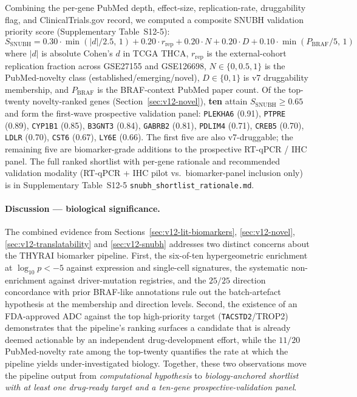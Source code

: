 Combining the per-gene PubMed depth, effect-size, replication-rate, druggability flag,
and ClinicalTrials.gov record, we computed a composite SNUBH validation priority score
(Supplementary Table~S12-5):
\[
S_\text{SNUBH} = 0.30 \cdot \min(|d|/2.5,\, 1) + 0.20 \cdot r_\text{rep}
                 + 0.20 \cdot N + 0.20 \cdot D
                 + 0.10 \cdot \min(P_\text{BRAF}/5,\, 1)
\]
where $|d|$ is absolute Cohen's $d$ in TCGA THCA, $r_\text{rep}$ is the external-cohort
replication fraction across GSE27155 and GSE126698, $N \in \{0, 0.5, 1\}$ is the
PubMed-novelty class (established/emerging/novel), $D \in \{0, 1\}$ is v7 druggability
membership, and $P_\text{BRAF}$ is the BRAF-context PubMed paper count. Of the top-twenty
novelty-ranked genes (Section~\ref{sec:v12-novel}), \textbf{ten} attain
$S_\text{SNUBH} \geq 0.65$ and form the first-wave prospective validation panel:
\texttt{PLEKHA6} (0.91), \texttt{PTPRE} (0.89), \texttt{CYP1B1} (0.85), \texttt{B3GNT3}
(0.84), \texttt{GABRB2} (0.81), \texttt{PDLIM4} (0.71), \texttt{CREB5} (0.70),
\texttt{LDLR} (0.70), \texttt{CST6} (0.67), \texttt{LY6E} (0.66). The first five are also
v7-druggable; the remaining five are biomarker-grade additions to the prospective
RT-qPCR / IHC panel. The full ranked shortlist with per-gene rationale and recommended
validation modality (RT-qPCR + IHC pilot vs.\ biomarker-panel inclusion only) is in
Supplementary Table~S12-5 \texttt{snubh\_shortlist\_rationale.md}.

\paragraph{Discussion --- biological significance.}
The combined evidence from
Sections~\ref{sec:v12-lit-biomarkers}, \ref{sec:v12-novel}, \ref{sec:v12-translatability}
and \ref{sec:v12-snubh} addresses two distinct concerns about the THYRAI biomarker
pipeline. First, the six-of-ten hypergeometric enrichment at $\log_{10} p < -5$ against
expression and single-cell signatures, the systematic non-enrichment against
driver-mutation registries, and the $25/25$ direction concordance with prior BRAF-like
annotations rule out the batch-artefact hypothesis at the membership and direction levels.
Second, the existence of an FDA-approved ADC against the top high-priority target
(\texttt{TACSTD2}/TROP2) demonstrates that the pipeline's ranking surfaces a candidate
that is already deemed actionable by an independent drug-development effort, while the
$11/20$ PubMed-novelty rate among the top-twenty quantifies the rate at which the
pipeline yields under-investigated biology. Together, these two observations move the
pipeline output from \emph{computational hypothesis} to \emph{biology-anchored shortlist
with at least one drug-ready target and a ten-gene prospective-validation panel}.

